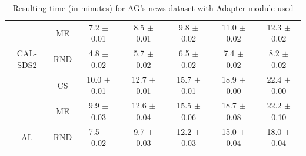 \begin{table}[htbp]
\begin{tabular*}{\linewidth}{c|c|@{\extracolsep{\fill}}ccccc}
 & ME & 7.2 $\pm$ {\small 0.01} & 8.5 $\pm$ {\small 0.01} & 9.8 $\pm$ {\small 0.02} & 11.0 $\pm$ {\small 0.02} & 12.3 $\pm$ {\small 0.02}\\

\multirow{-3}{*}{\raggedright\arraybackslash CAL-SDS2} & RND & 4.8 $\pm$ {\small 0.02} & 5.7 $\pm$ {\small 0.02} & 6.5 $\pm$ {\small 0.02} & 7.4 $\pm$ {\small 0.02} & 8.2 $\pm$ {\small 0.02}\\
\midrule
 & CS & 10.0 $\pm$ {\small 0.01} & 12.7 $\pm$ {\small 0.01} & 15.7 $\pm$ {\small 0.01} & 18.9 $\pm$ {\small 0.00} & 22.4 $\pm$ {\small 0.00}\\

 & ME & 9.9 $\pm$ {\small 0.03} & 12.6 $\pm$ {\small 0.04} & 15.5 $\pm$ {\small 0.06} & 18.7 $\pm$ {\small 0.08} & 22.2 $\pm$ {\small 0.10}\\

\multirow{-3}{*}{\raggedright\arraybackslash AL} & RND & 7.5 $\pm$ {\small 0.02} & 9.7 $\pm$ {\small 0.03} & 12.2 $\pm$ {\small 0.03} & 15.0 $\pm$ {\small 0.04} & 18.0 $\pm$ {\small 0.04}\\
\bottomrule
\end{tabular*}
\caption{Resulting time (in minutes) for AG's news dataset with Adapter module used}
\label{tab:time_full_agnews_10_adapter}
\end{table}
